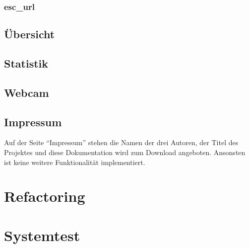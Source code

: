 \subsubsection{esc\_url}

\subsection{Übersicht}
\subsection{Statistik}
\subsection{Webcam}
\subsection{Impressum}

Auf der Seite "`Impressum"' stehen die Namen der drei Autoren, der Titel des Projektes und diese Dokumentation wird zum Download angeboten. Ansonsten ist keine weitere Funktionalität implementiert.
\section{Refactoring}
\section{Systemtest}

